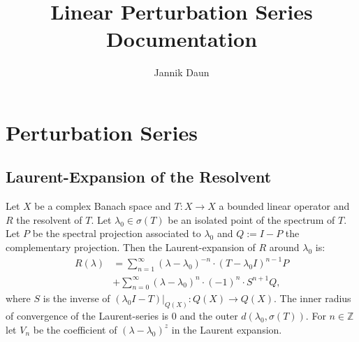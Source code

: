 \documentclass[11pt]{article}
\title{Linear Perturbation Series Documentation}
\author{Jannik Daun}
\begin{document}
\maketitle
\tableofcontents

\section{Perturbation Series}
\subsection{Laurent-Expansion of the Resolvent}
Let $X$ be a complex Banach space and $T :X \to X$ a bounded linear 
operator and $R$ the resolvent of $T$.
Let $ \lambda_0 \in \sigma (T)$ be an isolated point of the spectrum
of $T$. Let $P$ be the spectral projection associated to $\lambda_0$
and $Q:=I-P$ the complementary projection.
Then the Laurent-expansion of $R$ around $\lambda_0$ is:
\begin{equation}
    \begin{split}
        R(\lambda) &=
         \sum_{n=1}^\infty (\lambda - \lambda_0)^{-n} \cdot (T- \lambda_0I)^{n-1} P  \\
    &+ \sum_{n=0}^\infty (\lambda - \lambda_0)^n \cdot (-1)^n \cdot  S^{n+1} Q ,
    \end{split}
\end{equation}
where $S$ is the inverse of $(\lambda_0 I- T)|_{Q(X)}: Q(X) \to Q(X)$.
The inner radius of convergence of the Laurent-series is $0$ and the outer $d(\lambda_0 , \sigma(T))$.
For $n \in \mathbb{Z}$ let $V_n$ be the coefficient of $(\lambda-\lambda_0)^{z}$ in the Laurent expansion.
\end{document}
